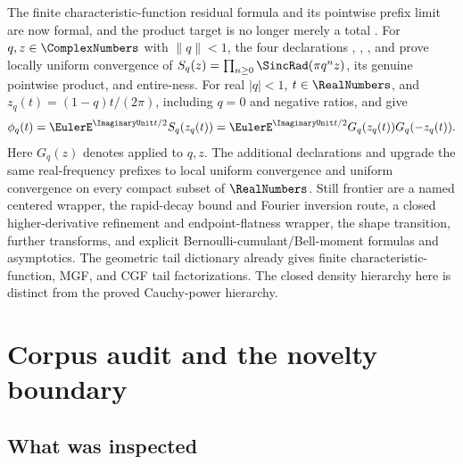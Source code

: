 \documentclass[11pt]{article}
\numberwithin{equation}{section}
\theoremstyle{definition}
\theoremstyle{remark}
\begin{document}
\begin{boxedremark}
The finite characteristic-function residual formula and its pointwise prefix limit are now
formal, and the product target is no longer merely a total .  For
\(q,z\in\ComplexNumbers\) with \(\lVert q\rVert<1\), the four declarations
,
,
, and
 prove locally uniform convergence of
\(S_q(z)=\prod_{n\ge0}\SincRad(\pi q^nz)\), its genuine pointwise product, and entire-ness.
For real \(|q|<1\), \(t\in\RealNumbers\), and \(z_q(t)=(1-q)t/(2\pi)\), including \(q=0\) and negative
ratios,  and
 give
\[
 \phi_q(t)=\EulerE^{\ImaginaryUnit t/2}S_q(z_q(t))
 =\EulerE^{\ImaginaryUnit t/2}G_q(z_q(t))G_q(-z_q(t)).
\]
Here \(G_q(z)\) denotes  applied to \(q,z\).
The additional declarations  and
 upgrade the same real-frequency prefixes to
local uniform convergence and uniform convergence on every compact subset of \(\RealNumbers\).
Still frontier are a named centered wrapper, the rapid-decay bound and Fourier
inversion route, a closed higher-derivative refinement and endpoint-flatness wrapper, the
shape transition, further transforms, and explicit Bernoulli-cumulant/Bell-moment formulas
and asymptotics.  The geometric tail dictionary already gives finite characteristic-function,
MGF, and CGF tail factorizations.  The closed density hierarchy here is distinct from the
proved Cauchy-power hierarchy.
\end{boxedremark}


\newpage

\section{Corpus audit and the novelty boundary}
\label{p10:sec:corpus}

\subsection{What was inspected}
\end{document}
